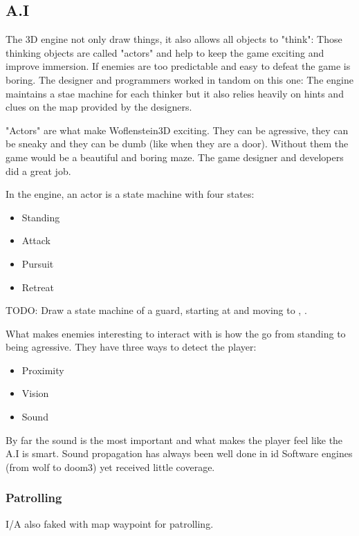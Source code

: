\subsection{A.I}
The 3D engine not only draw things, it also allows all objects to "think": Those thinking objects are called "actors" and help to keep the game exciting and improve immersion. If enemies are too predictable and easy to defeat the game is boring. The designer and programmers worked in tandom on this one: The engine maintains a stae machine for each thinker but it also relies heavily on hints and clues on the map provided by the designers.\\
\par







"Actors" are what make Woflenstein3D exciting. They can be agressive, they can be sneaky and they can be dumb (like when they are a door). Without them the game would be a beautiful and boring maze. The game designer and developers did a great job.\\
\par
In the engine, an actor is a state machine with four states:
\begin{itemize}
\item Standing
\item Attack
\item Pursuit
\item Retreat
\end{itemize}
\par
TODO: Draw a state machine of a guard, starting at  and moving to , .
\par
What makes enemies interesting to interact with is how the go from standing to being agressive. They have three ways to detect the player:\\
\begin{itemize}
\item Proximity
\item Vision
\item Sound
\end{itemize}
By far the sound is the most important and what makes the player feel like the A.I is smart. Sound propagation has always been well done in id Software engines (from wolf to doom3) yet received little coverage.

\subsubsection{Patrolling}
I/A also faked with map waypoint for patrolling.\\








